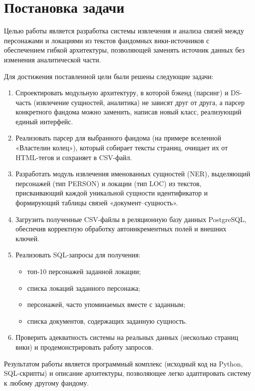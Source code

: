 \section{Постановка задачи}
\label{sec:task}

Целью работы является разработка системы извлечения и анализа связей между персонажами и локациями из текстов фандомных вики-источников с обеспечением гибкой архитектуры, позволяющей заменять источник данных без изменения аналитической части.

Для достижения поставленной цели были решены следующие задачи:
\begin{enumerate}
    \item Спроектировать модульную архитектуру, в которой бэкенд (парсинг) и DS-часть (извлечение сущностей, аналитика) не зависят друг от друга, а парсер конкретного фандома можно заменить, написав новый класс, реализующий единый интерфейс.
    \item Реализовать парсер для выбранного фандома (на примере вселенной «Властелин колец»), который собирает тексты страниц, очищает их от HTML-тегов и сохраняет в CSV-файл.
    \item Разработать модуль извлечения именованных сущностей (NER), выделяющий персонажей (тип PERSON) и локации (тип LOC) из текстов, присваивающий каждой уникальной сущности идентификатор и формирующий таблицы связей «документ–сущность».
    \item Загрузить полученные CSV-файлы в реляционную базу данных PostgreSQL, обеспечив корректную обработку автоинкрементных полей и внешних ключей.
    \item Реализовать SQL-запросы для получения:
        \begin{itemize}
            \item топ-10 персонажей заданной локации;
            \item списка локаций заданного персонажа;
            \item персонажей, часто упоминаемых вместе с заданным;
            \item списка документов, содержащих заданную сущность.
        \end{itemize}
    \item Проверить адекватность системы на реальных данных (несколько страниц вики) и продемонстрировать работу запросов.
\end{enumerate}

Результатом работы является программный комплекс (исходный код на Python, SQL-скрипты) и описание архитектуры, позволяющее легко адаптировать систему к любому другому фандому.
